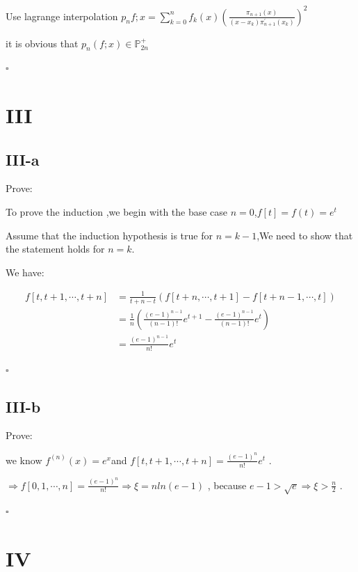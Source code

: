 \documentclass[a4paper]{article}
\begin{document}
Use lagrange interpolation 
$p_{n}{f;x}=\sum_{k = 0}^{n}f_{k}(x)(\frac{\pi _{n+1}(x)}{(x-x_{k})\pi^{'}_{n+1}(x_{k})})^{2}$

it is obvious that $p_{n}(f;x) \in \mathbb{P}_{2n}^{+} $
\begin{flushright} 
    $\square$ 
\end{flushright} 


\section*{III}
\subsection*{III-a}
Prove:

To prove the induction ,we begin with the base case $n=0$,$f[t]=f(t)=e^{t}$

Assume that the induction hypothesis is true for $n=k-1$,We need to show that the statement holds for $n=k$.

We have:

\begin{align}
    f[t,t+1,\cdots,t+n] & =\frac{1}{t+n-t}(f[t+n,\cdots,t+1]-f[t+n-1,\cdots,t])\\
                        & =\frac{1}{n}(\frac{(e-1)^{n-1}}{(n-1)!}e^{t+1}-\frac{(e-1)^{n-1}}{(n-1)!}e^{t})\\
                        & =\frac{(e-1)^{n-1}}{n!}e^{t}
\end{align}


\begin{flushright} 
    $\square$ 
\end{flushright} 

\subsection*{III-b}
Prove:

we know $f^{(n)}(x)=e^{x}$and $f[t,t+1,\cdots,t+n]=\frac{(e-1)^{n}}{n!}e^{t}$ .

$ \Rightarrow f[0,1,\cdots,n]=\frac{(e-1)^{n}}{n!} \Rightarrow \xi=nln(e-1) $ ,
because $e-1>\sqrt{e} \Rightarrow \xi>\frac{n}{2}$ .
\begin{flushright} 
    $\square$ 
\end{flushright} 


\section*{IV}
\end{document}
